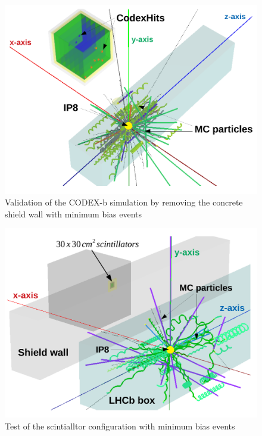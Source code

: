 \begin{figure}[h]
\centering
    \includegraphics[width=12cm]{figs/INT/Minbias.pdf}
\caption{
    Validation of the CODEX-b simulation by removing the concrete shield wall with minimum bias events 
}
\end{figure}

\begin{figure}[h]
\centering
    \includegraphics[width=12cm]{figs/INT/Scint.pdf}
\caption{
    Test of the scintialltor configuration with minimum bias events
}
\end{figure}
